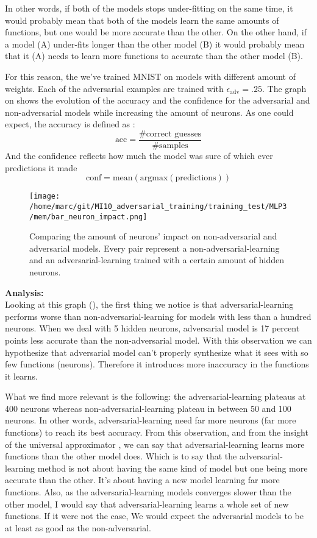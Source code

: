 			In other words, if both of the models stops under-fitting on the same time, it would probably mean that both of the models learn the same amounts of functions, but one would be more accurate than the other. On the other hand, if a model (A) under-fits longer than the other model (B) it would probably mean that it (A) needs to learn more functions to accurate than the other model (B).

			For this reason, the we've trained MNIST on models with different amount of weights. Each of the adversarial examples are trained with $\epsilon_{\text{adv}} = .25$. The graph on  shows the evolution of the accuracy and the confidence for the adversarial and non-adversarial models while increasing the amount of neurons. As one could expect, the accuracy is defined as :
			$$\text{acc} = \frac{\text{\#correct guesses}}{\text{\#samples}}$$ 
			And the confidence reflects how much the model was sure of which ever predictions it made 
			$$\text{conf} =  \text{mean}( \text{argmax} (\text{predictions}))$$

			\begin{figure}
				\centering
				\texttt{[image: /home/marc/git/MI10\_adversarial\_training/training\_test/MLP3/mem/bar\_neuron\_impact.png]}
				\caption{Comparing the amount of neurons' impact on non-adversarial and adversarial models. Every pair represent a non-adversarial-learning and an adversarial-learning trained with a certain amount of hidden neurons.}
				\label{fig:mnist_neurons}
			\end{figure}

			\vskip 1cm
			\textbf{Analysis:}\\
			Looking at this graph (), the first thing we notice is that adversarial-learning performs worse than non-adversarial-learning for models with less than a hundred neurons. When we deal with 5 hidden neurons, adversarial model is 17 percent points less accurate than the non-adversarial model. With this observation we can hypothesize that adversarial model can't properly synthesize what it sees with so few functions (neurons). Therefore it introduces more inaccuracy in the functions it learns.

			What we find more relevant is the following: the adversarial-learning plateaus at 400 neurons whereas non-adversarial-learning plateau in between 50 and 100 neurons. In other words, adversarial-learning need far more neurons (far more functions) to reach its best accuracy. From this observation, and from the insight of the universal approximator \cite{hornik1989multilayer}, we can say that adversarial-learning learns more functions than the other model does. Which is to say that the adversarial-learning method is not about having the same kind of model but one being more accurate than the other. It's about having a new model learning far more  functions. Also, as the adversarial-learning models converges slower than the other model, I would say that adversarial-learning learns a whole set of new functions. If it were not the case, We would expect the adversarial models to be at least as good as the non-adversarial.




